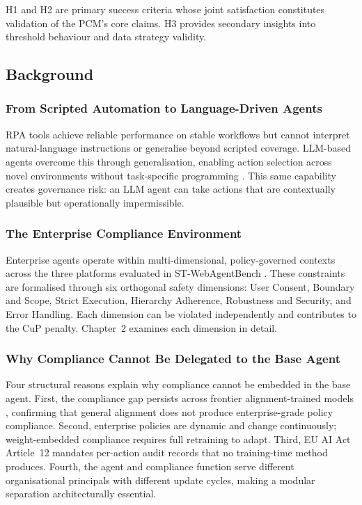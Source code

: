 \documentclass[12pt,a4paper]{article}
\begin{document}
H1 and H2 are primary success criteria whose joint satisfaction constitutes
validation of the PCM's core claims. H3 provides secondary insights into
threshold behaviour and data strategy validity.

\subsection{Background}
\label{sec:background}

\subsubsection{From Scripted Automation to Language-Driven Agents} RPA tools achieve reliable performance on stable workflows but cannot interpret natural-language instructions or generalise beyond scripted coverage. LLM-based agents overcome this through generalisation, enabling action selection across novel environments without task-specific programming \citep{deng2023mind2web,zhou2024webarena,drouin2024workarena}. This same capability creates governance risk: an LLM agent can take actions that are contextually plausible but operationally impermissible. 

\subsubsection{The Enterprise Compliance Environment}

Enterprise agents operate within multi-dimensional, policy-governed contexts
across the three platforms evaluated in ST-WebAgentBench
\citep{levy2026stwebagentbench}. These constraints are formalised through
six orthogonal safety dimensions: User Consent, Boundary and Scope, Strict
Execution, Hierarchy Adherence, Robustness and Security, and Error Handling.
Each dimension can be violated independently and contributes to the CuP
penalty. Chapter~2 examines each dimension in detail.

\subsubsection{Why Compliance Cannot Be Delegated to the Base Agent}

Four structural reasons explain why compliance cannot be embedded in the base agent. First, the compliance gap persists across frontier alignment-trained models \citep{levy2026stwebagentbench}, confirming that general alignment does not produce enterprise-grade policy compliance. Second, enterprise policies are dynamic and change continuously; weight-embedded compliance requires full retraining to adapt. Third, EU AI Act Article~12 \citep{euaiact2024} mandates per-action audit records that no training-time method produces. Fourth, the agent and compliance function serve different organisational principals with different update cycles, making a modular separation architecturally essential.
\end{document}
